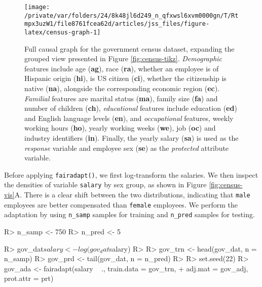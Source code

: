 \documentclass[
  nojss]{jss}
\begin{document}
\begin{CodeChunk}
\begin{figure}

{\centering \texttt{[image: /private/var/folders/24/8k48jl6d249\_n\_qfxwsl6xvm0000gn/T/Rtmpx3uzW1/file8761fcea62d/articles/jss\_files/figure-latex/census-graph-1]} 

}

\caption{Full causal graph for the government census dataset, expanding the grouped view presented in Figure \ref{fig:census-tikz}. \textit{Demographic} features include age (\textbf{ag}), race (\textbf{ra}), whether an employee is of Hispanic origin (\textbf{hi}), is US citizen (\textbf{ci}), whether the citizenship is native (\textbf{na}), alongside the corresponding economic region (\textbf{ec}). \textit{Familial} features are marital status (\textbf{ma}), family size (\textbf{fa}) and number of children (\textbf{ch}), \textit{educational} features include education (\textbf{ed}) and English language levels (\textbf{en}), and \textit{occupational} features, weekly working hours (\textbf{ho}), yearly working weeks (\textbf{we}), job (\textbf{oc}) and industry identifiers (\textbf{in}). Finally, the yearly salary (\textbf{sa}) is used as the \textit{response} variable and employee sex (\textbf{se}) as the \textit{protected} attribute variable.}\label{fig:census-graph}
\end{figure}
\end{CodeChunk}

Before applying \texttt{fairadapt()}, we first log-transform the
salaries. We then inspect the densities of variable \texttt{salary} by
sex group, as shown in Figure \ref{fig:census-vis}A. There is a clear
shift between the two distributions, indicating that \texttt{male}
employees are better compensated than \texttt{female} employees. We
perform the adaptation by using \texttt{n\_samp} samples for training
and \texttt{n\_pred} samples for testing.

\begin{CodeChunk}
\begin{CodeInput}
R> n_samp <- 750
R> n_pred <- 5
\end{CodeInput}
\end{CodeChunk}

\begin{CodeChunk}
\begin{CodeInput}
R> gov_dat$salary <- log(gov_dat$salary)
R> 
R> gov_trn <- head(gov_dat, n = n_samp)
R> gov_prd <- tail(gov_dat, n = n_pred)
R> 
R> set.seed(22)
R> gov_ada <- fairadapt(salary ~ ., train.data = gov_trn,
+                      adj.mat = gov_adj, prot.attr = prt)
\end{CodeInput}
\end{CodeChunk}
\end{document}
